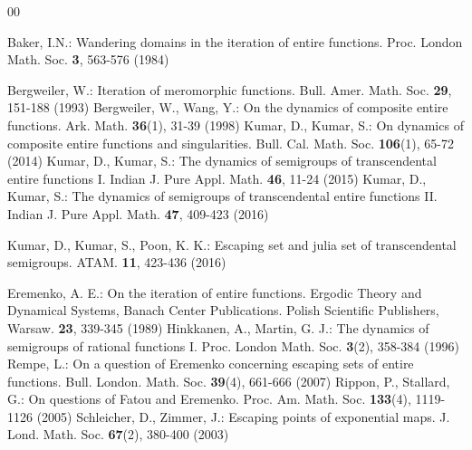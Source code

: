 \documentclass[a4paper,12pt]{amsart}
\numberwithin{equation}{section}
\begin{document}
	\begin{thebibliography}{00}
		
		 Baker, I.N.: Wandering domains in the iteration of entire functions. Proc. London Math. Soc. \textbf{3}, 563-576 (1984)
		
			 Bergweiler, W.: Iteration of meromorphic functions. Bull. Amer. Math. Soc. \textbf{29}, 151-188 (1993)
				 Bergweiler, W., Wang, Y.: On the dynamics of composite entire functions. Ark. Math. \textbf{36}(1), 31-39 (1998)
		 Kumar, D., Kumar, S.: On dynamics of composite entire functions and singularities. Bull. Cal. Math. Soc. \textbf{106}(1), 65-72 (2014)
		 Kumar, D., Kumar, S.: The dynamics of semigroups of transcendental entire functions I.  Indian J. Pure Appl. Math. \textbf{46}, 11-24 (2015) 
		 Kumar, D., Kumar, S.: The dynamics of semigroups of transcendental entire functions II.  Indian J. Pure Appl. Math. \textbf{47}, 409-423 (2016) 
		

		 Kumar, D., Kumar, S., Poon, K. K.: Escaping set and julia set of transcendental semigroups. ATAM. \textbf{11}, 423-436 (2016) 
			
			  Eremenko, A. E.: On the iteration of entire functions. Ergodic Theory and Dynamical Systems, Banach Center Publications. Polish Scientific Publishers, Warsaw. \textbf{23}, 339-345 (1989)
			 Hinkkanen, A., Martin, G. J.: The dynamics of semigroups of rational functions I. Proc. London Math. Soc. \textbf{3}(2), 358-384 (1996)
		 Rempe, L.: On a question of Eremenko concerning escaping sets of entire functions. Bull. London. Math. Soc. \textbf{39}(4), 661-666 (2007)
			 Rippon, P., Stallard, G.: On questions of Fatou and Eremenko. Proc. Am. Math. Soc. \textbf{133}(4), 1119-1126 (2005)
	 Schleicher, D., Zimmer, J.: Escaping points of exponential maps. J. Lond. Math. Soc. \textbf{67}(2), 380-400 (2003)

	\end{thebibliography}
	
	
	
	
	
	
	
	
	
\end{document}
